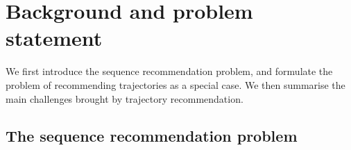 

\section{Background and problem statement}


We first introduce the sequence recommendation problem,
and formulate the problem of recommending trajectories as a special case.
We then summarise the main challenges brought by trajectory recommendation.


\subsection{The sequence recommendation problem}

